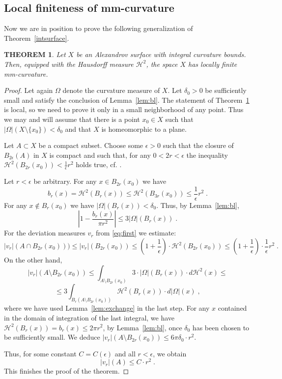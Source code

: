 \documentclass[12pt,leqno]{amsart}
\numberwithin{equation}{section}
\newtheorem{thm}{THEOREM}[section]
\theoremstyle{definition}
\theoremstyle{remark}
\newcommand{\tref}[1]{Theorem~\ref{#1}}
\newcommand{\lref}[1]{Lemma~\ref{#1}}
\begin{document}
 \subsection{Local finiteness of mm-curvature}
 Now we are in position to prove
 the following generalization of  \tref{intsurface}.
 \begin{thm}\label{intsurface1}
 Let $X$ be an Alexandrov surface with integral curvature bounds.  Then,  equipped with the Hausdorff measure $\mathcal H^2$, the space $X$ has locally finite mm-curvature.
  \end{thm}
 \begin{proof}
 Let again $\Omega$ denote the curvature measure of $X$. Let $\delta _0>0$ be sufficiently small and satisfy the conclusion of  \lref{lem:bl}.
 The statement  of \tref{intsurface1} is local, so we need to prove it only in a small neighborhood of any point.
 Thus we may and will assume that there is a point $x_0\in X$
 such that $| \Omega| (X \setminus  \{ x_0 \} )< \delta _0$ and that $X$ is homeomorphic to a plane.



  Let  $A\subset X$  be a compact subset. Choose some $\epsilon >0$ such that the closure of  $B_{2\epsilon} (A)$ in $X$ is compact and such that,
  for any $0<2r<\epsilon$  the inequality  $\mathcal H^2 (B_{2r}(x_0)) < \frac 1 {\epsilon} r^2$ holds true,   cf. \cite[Lemma 8.1.1]{Reshetnyak-GeomIV}.

 Let  $r<\epsilon$    be arbitrary.
 For any $x\in B_{2r} (x_0)$ we have $$b_r (x)  =\mathcal H^2 (B_r (x)) \leq \mathcal H^2 (B_{3r} (x_0)) \leq \frac 1 {\epsilon} r^2 \; .$$
For any $x\notin B_{r} (x_0)$ we have $| \Omega |(B_r (x)) < \delta _0$. Thus, by Lemma~\ref{lem:bl}, $$|1-\frac {b_r(x)}  {\pi r^2} | \leq 3 |\Omega | ( B_{r} (x))\; .$$
For the  deviation measures $v_r$ from \eqref{eq:first} we estimate:
 $$|v_r| (A\cap B_{2r} (x_0))) \leq |v_r| (B_{2r} (x_0))  \leq (1+ \frac 1 {\epsilon}) \cdot \mathcal H^2 (B_{2r} (x_0)) \leq
 (1+ \frac 1 {\epsilon}) \cdot \frac 1 {\epsilon} r^2 \; .$$
On the other hand,
$$|v_r| (A\setminus B_{2r} (x_0)) \leq \int _{A \setminus B_{2r} (x_0) } 3 \cdot |\Omega| (B_r (x)) \cdot  d\mathcal H^2 (x)  \leq $$
$$\leq 3 \int _{B_r (A\setminus B_{2r} (x_0))} \mathcal H^2 (B_r(x))  \cdot d|\Omega | (x) \; ,$$
where we have used \lref{lem:exchange} in the last step.
 For any $x$  contained in the domain of integration of the last integral, we have $\mathcal H^2 (B_r(x))  =b_r (x) \leq 2\pi  r^2$, by \lref{lem:bl}, once $\delta _0$ has been chosen to be sufficiently  small.
We deduce $|v_r| (A\setminus B_{2r} (x_0)) \leq 6 \pi \delta _0 \cdot r^2$.

Thus, for some constant $C=C(\epsilon)$ and all $r<\epsilon$, we obtain
$$|v_r|(A) \leq C\cdot r^2 \; .$$
This finishes the proof of the theorem.
\end{proof}
\end{document}
